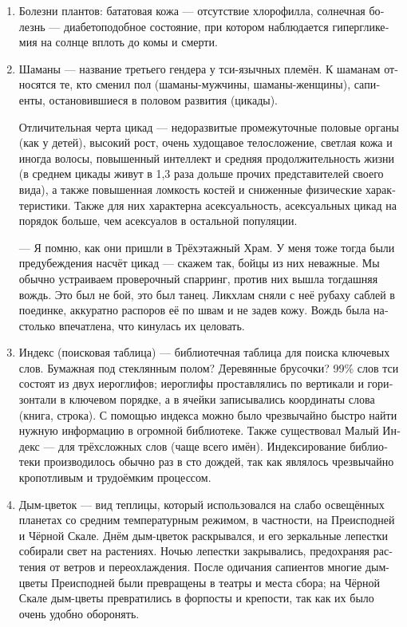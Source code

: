 \documentclass[a4paper,12pt,fleqn]{book}\usepackage{cooltooltips}\usepackage{polyglossia}\setdefaultlanguage[babelshorthands=true]{russian}\setotherlanguage{english}\defaultfontfeatures{Ligatures=TeX,Mapping=tex-text} \usepackage{xcolor}\definecolor{lightgray}{HTML}{bbbbbb}\color{lightgray}\newcommand{\ml}[3]{\textenglish{\textcolor{black}{#3}}}
\begin{document}
{\begin{enumerate}
\item Болезни плантов: бататовая кожа --- отсутствие хлорофилла, солнечная болезнь --- диабетоподобное состояние, при котором наблюдается гипергликемия на солнце вплоть до комы и смерти.

\item Шаманы --- название третьего гендера у тси-язычных племён.
К шаманам относятся те, кто сменил пол (шаманы-мужчины, шаманы-женщины), сапиенты, остановившиеся в половом развития (цикады).

Отличительная черта цикад --- недоразвитые промежуточные половые органы (как у детей), высокий рост, очень худощавое телосложение, светлая кожа и иногда волосы, повышенный интеллект и средняя продолжительность жизни (в среднем цикады живут в 1,3 раза дольше прочих представителей своего вида), а также повышенная ломкость костей и сниженные физические характеристики.
Также для них характерна асексуальность, асексуальных цикад на порядок больше, чем асексуалов в остальной популяции.

--- Я помню, как они пришли в Трёхэтажный Храм.
У меня тоже тогда были предубеждения насчёт цикад --- скажем так, бойцы из них неважные.
Мы обычно устраиваем проверочный спарринг, против них вышла тогдашняя вождь.
Это был не бой, это был танец.
Ликхлам сняли с неё рубаху саблей в поединке, аккуратно распоров её по швам и не задев кожу.
Вождь была настолько впечатлена, что кинулась их целовать.

\item Индекс (поисковая таблица) --- библиотечная таблица для поиска ключевых слов. Бумажная под стеклянным полом?
Деревянные брусочки?
99\% слов тси состоят из двух иероглифов;
иероглифы проставлялись по вертикали и горизонтали в ключевом порядке, а в ячейки записывались координаты слова (книга, строка).
С помощью индекса можно было чрезвычайно быстро найти нужную информацию в огромной библиотеке.
Также существовал Малый Индекс --- для трёхсложных слов (чаще всего имён).
Индексирование библиотеки производилось обычно раз в сто дождей, так как являлось чрезвычайно кропотливым и трудоёмким процессом.

\item Дым-цветок --- вид теплицы, который использовался на слабо освещённых планетах со средним температурным режимом, в частности, на Преисподней и Чёрной Скале.
Днём дым-цветок раскрывался, и его зеркальные лепестки собирали свет на растениях.
Ночью лепестки закрывались, предохраняя растения от ветров и переохлаждения.
После одичания сапиентов многие дым-цветы Преисподней были превращены в театры и места сбора;
на Чёрной Скале дым-цветы превратились в форпосты и крепости, так как их было очень удобно оборонять.


\end{enumerate}}
\end{document}

